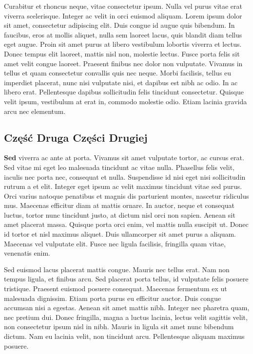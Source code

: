 \documentclass[]{article}
\begin{document}
Curabitur et rhoncus neque, vitae consectetur ipsum. Nulla vel purus vitae erat viverra scelerisque. Integer ac velit in orci euismod aliquam. Lorem ipsum dolor sit amet, consectetur adipiscing elit. Duis congue id augue quis bibendum. In faucibus, eros at mollis aliquet, nulla sem laoreet lacus, quis blandit diam tellus eget augue. Proin sit amet purus at libero vestibulum lobortis viverra et lectus. Donec tempus elit laoreet, mattis nisl non, molestie lectus. Fusce porta felis sit amet velit congue laoreet. Praesent finibus nec dolor non vulputate. Vivamus in tellus et quam consectetur convallis quis nec neque. Morbi facilisis, tellus eu imperdiet placerat, nunc nisi vulputate nisi, et dapibus est nibh ac odio. In ac libero erat. Pellentesque dapibus sollicitudin felis tincidunt consectetur. Quisque velit ipsum, vestibulum at erat in, commodo molestie odio. Etiam lacinia gravida arcu nec elementum.
\newpage
\subsection{Część Druga Części Drugiej}
\textbf{Sed} viverra ac ante at porta. Vivamus sit amet vulputate tortor, ac cursus erat. Sed vitae mi eget leo malesuada tincidunt ac vitae nulla. Phasellus felis velit, iaculis nec porta nec, consequat et nulla. Suspendisse id nisi eget nisi sollicitudin rutrum a et elit. Integer eget ipsum ac velit maximus tincidunt vitae sed purus. Orci varius natoque penatibus et magnis dis parturient montes, nascetur ridiculus mus. Maecenas efficitur diam at mattis ornare. In auctor, neque et consequat luctus, tortor nunc tincidunt justo, at dictum nisl orci non sapien. Aenean sit amet placerat massa. Quisque porta orci enim, vel mattis nulla suscipit ut. Donec id tortor et nisl maximus aliquet. Duis ullamcorper sit amet purus a aliquam. Maecenas vel vulputate elit. Fusce nec ligula facilisis, fringilla quam vitae, venenatis enim.

Sed euismod lacus placerat mattis congue. Mauris nec tellus erat. Nam non tempus ligula, et finibus arcu. Sed placerat porta tellus, id vulputate felis posuere tristique. Praesent euismod posuere consequat. Maecenas fermentum ex ut malesuada dignissim. Etiam porta purus eu efficitur auctor. Duis congue accumsan nisi a egestas. Aenean sit amet mattis nibh. Integer nec pharetra quam, nec pretium dui. Donec fringilla, magna a luctus lacinia, lectus velit sagittis velit, non consectetur ipsum nisl in nibh. Mauris in ligula sit amet nunc bibendum dictum. Nam eu lacinia velit, non tincidunt arcu. Pellentesque aliquam maximus posuere.
\end{document}
